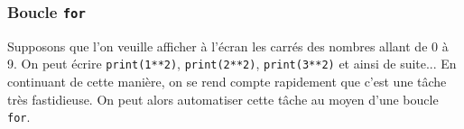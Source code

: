 \subsubsection[Boucle {\normalfont\texttt{for}}]{Boucle {\normalfont\texttt{for}}}
\label{subsub:XI.3.2.1}


Supposons que l'on veuille afficher à l'écran les carrés des nombres allant de 0 à 9. On peut écrire \texttt{print(1**2)}, \texttt{print(2**2)}, \texttt{print(3**2)} et ainsi de suite... En continuant de cette manière, on se rend compte rapidement que c'est une tâche très fastidieuse. On peut alors automatiser cette tâche au moyen d'une boucle \texttt{for}.


